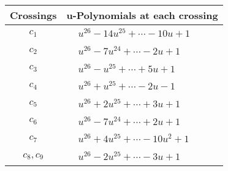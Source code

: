 \documentclass[1p]{elsarticle_modified}
\theoremstyle{definition}
\begin{document}
\begin{tabular}{m{50pt}|m{274pt}}
Crossings & \hspace{64pt}u-Polynomials at each crossing \\
\hline $$\begin{aligned}c_{1}\end{aligned}$$&$\begin{aligned}
&u^{26}-14 u^{25}+\cdots-10 u+1
\end{aligned}$\\
\hline $$\begin{aligned}c_{2}\end{aligned}$$&$\begin{aligned}
&u^{26}-7 u^{24}+\cdots-2 u+1
\end{aligned}$\\
\hline $$\begin{aligned}c_{3}\end{aligned}$$&$\begin{aligned}
&u^{26}- u^{25}+\cdots+5 u+1
\end{aligned}$\\
\hline $$\begin{aligned}c_{4}\end{aligned}$$&$\begin{aligned}
&u^{26}+u^{25}+\cdots-2 u-1
\end{aligned}$\\
\hline $$\begin{aligned}c_{5}\end{aligned}$$&$\begin{aligned}
&u^{26}+2 u^{25}+\cdots+3 u+1
\end{aligned}$\\
\hline $$\begin{aligned}c_{6}\end{aligned}$$&$\begin{aligned}
&u^{26}-7 u^{24}+\cdots+2 u+1
\end{aligned}$\\
\hline $$\begin{aligned}c_{7}\end{aligned}$$&$\begin{aligned}
&u^{26}+4 u^{25}+\cdots-10 u^2+1
\end{aligned}$\\
\hline $$\begin{aligned}c_{8},c_{9}\end{aligned}$$&$\begin{aligned}
&u^{26}-2 u^{25}+\cdots-3 u+1
\end{aligned}$\\

\end{tabular}
\end{document}
